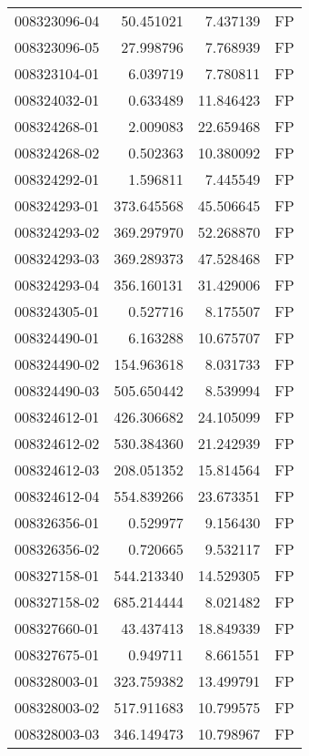 \begin{tabular}{lrrl}
008323096-04 &   50.451021 &       7.437139 &   FP \\
008323096-05 &   27.998796 &       7.768939 &   FP \\
008323104-01 &    6.039719 &       7.780811 &   FP \\
008324032-01 &    0.633489 &      11.846423 &   FP \\
008324268-01 &    2.009083 &      22.659468 &   FP \\
008324268-02 &    0.502363 &      10.380092 &   FP \\
008324292-01 &    1.596811 &       7.445549 &   FP \\
008324293-01 &  373.645568 &      45.506645 &   FP \\
008324293-02 &  369.297970 &      52.268870 &   FP \\
008324293-03 &  369.289373 &      47.528468 &   FP \\
008324293-04 &  356.160131 &      31.429006 &   FP \\
008324305-01 &    0.527716 &       8.175507 &   FP \\
008324490-01 &    6.163288 &      10.675707 &   FP \\
008324490-02 &  154.963618 &       8.031733 &   FP \\
008324490-03 &  505.650442 &       8.539994 &   FP \\
008324612-01 &  426.306682 &      24.105099 &   FP \\
008324612-02 &  530.384360 &      21.242939 &   FP \\
008324612-03 &  208.051352 &      15.814564 &   FP \\
008324612-04 &  554.839266 &      23.673351 &   FP \\
008326356-01 &    0.529977 &       9.156430 &   FP \\
008326356-02 &    0.720665 &       9.532117 &   FP \\
008327158-01 &  544.213340 &      14.529305 &   FP \\
008327158-02 &  685.214444 &       8.021482 &   FP \\
008327660-01 &   43.437413 &      18.849339 &   FP \\
008327675-01 &    0.949711 &       8.661551 &   FP \\
008328003-01 &  323.759382 &      13.499791 &   FP \\
008328003-02 &  517.911683 &      10.799575 &   FP \\
008328003-03 &  346.149473 &      10.798967 &   FP \\

\end{tabular}

